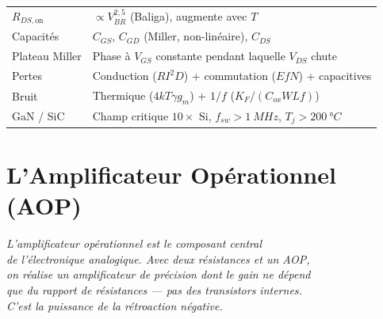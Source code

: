 \documentclass[12pt,a4paper,twoside]{book}
\begin{document}
\begin{ingenieur}[title={\color{white} Résumé --- Niveau Ingénieur}]
\begin{center}
\renewcommand{\arraystretch}{1.3}
\begin{tabular}{p{3.5cm}p{9.5cm}}
\toprule
$R_{DS,\text{on}}$ & $\propto V_{BR}^{2{,}5}$ (Baliga), augmente avec $T$ \\
Capacités & $C_{GS}$, $C_{GD}$ (Miller, non-linéaire), $C_{DS}$ \\
Plateau Miller & Phase à $V_{GS}$ constante pendant laquelle $V_{DS}$ chute \\
Pertes & Conduction ($RI^2D$) + commutation ($EfN$) + capacitives \\
Bruit & Thermique ($4kT\gamma g_m$) + $1/f$ ($K_F/(C_{ox}WLf)$) \\
GaN / SiC & Champ critique $10\times$ Si, $f_{sw} > \SI{1}{MHz}$, $T_j > \SI{200}{°C}$ \\
\bottomrule
\end{tabular}
\end{center}
\end{ingenieur}


\chapter{L'Amplificateur Opérationnel (AOP)}

\begin{center}
\textit{L'amplificateur opérationnel est le composant central\\
de l'électronique analogique. Avec deux résistances et un AOP,\\
on réalise un amplificateur de précision dont le gain ne dépend\\
que du rapport de résistances --- pas des transistors internes.\\
C'est la puissance de la rétroaction négative.}
\end{center}
\end{document}
